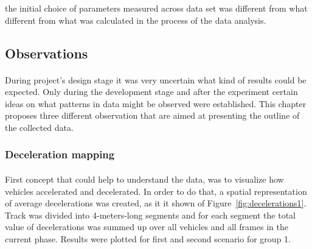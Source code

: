 \documentclass[11pt,english]{article}
\begin{document}
the initial choice of parameters measured across data set was different from what different from what was calculated in the process of the data analysis.



\subsection{Observations}


\paragraph{}

During project's design stage it was very uncertain what kind of results could be expected. Only during the development stage and after the experiment certain ideas on what patterns in data might be observed were established. This chapter proposes three different observation that are aimed at presenting the outline of the collected data. 











\subsubsection{Deceleration mapping}
\paragraph{}

First concept that could help to understand the data, was to visualize how vehicles accelerated and decelerated. In order to do that, a spatial representation of average decelerations was created, as it it shown of Figure~\ref{fig:decelerations1}. Track was divided into 4-meters-long segments and for each segment the total value of decelerations was summed up over all vehicles and all frames in the current phase. Results were plotted for first and second scenario for group 1.
\end{document}
